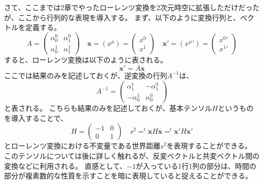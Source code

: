 \documentclass[a4paper]{jsreport}
\begin{document}
            さて、ここまでは2章でやったローレンツ変換を2次元時空に拡張しただけだったが、ここから行列的な表現を導入する。
            まず、以下のように変換行列と、ベクトルを定義する。
            \begin{equation}
                A = \begin{pmatrix}
                    \alpha^0_0 & \alpha^0_1 \\
                    \alpha^1_0 & \alpha^1_1
                \end{pmatrix} \quad
                \mathbf{x} = (x^\mu) = \begin{pmatrix}
                    x^0 \\
                    x^1
                \end{pmatrix} \quad
                \mathbf{x'} = ({x^\mu}') = \begin{pmatrix}
                    {x^0}' \\
                    {x^1}'
                \end{pmatrix}
            \end{equation}
            すると、ローレンツ変換は以下のように表される。
            \begin{equation} \label{eq:3k}
                \mathbf{x'} = A \mathbf{x}
            \end{equation}
            ここでは結果のみを記述しておくが、逆変換の行列$A^{-1}$は、
            \begin{equation} 
                A^{-1} = \begin{pmatrix}
                    \alpha^1_1 & -\alpha^0_1 \\
                    -\alpha^1_0 & \alpha^0_0
                \end{pmatrix}
            \end{equation}
            と表される。
            こちらも結果のみを記述しておくが、基本テンソル$H$というものを導入することで、
            \begin{equation}
                H =  \begin{pmatrix}
                    -1 & 0 \\
                    0 & 1
                \end{pmatrix} \quad
                s^2 = ^t\!\mathbf{x} H \mathbf{x} = ^t\!\mathbf{x'} H \mathbf{x'}
            \end{equation}
            とローレンツ変換における不変量である世界距離$s^2$を表現することができる。
            このテンソルについては後に詳しく触れるが、反変ベクトルと共変ベクトル間の変換などに利用される。
            直感として、$-1$が入っている1行1列の部分は、時間の部分が複素数的な性質を示すことを暗に表現していると捉えることができる。
            
\end{document}
